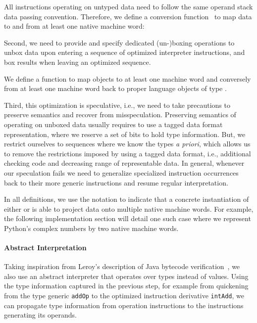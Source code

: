 \documentclass[preprint,10pt]{popl14conf}
\begin{document}
\begin{defn}
  All instructions operating on untyped data need to follow the same operand stack data passing
  convention.
  Therefore, we define a conversion function~ to map data to and from at least one
  native machine word:
  
\end{defn}

Second, we need to provide and specify dedicated (un-)boxing operations to unbox data upon entering a
sequence of optimized interpreter instructions, and box results when leaving an optimized sequence.
\begin{defn}
  We define a function  to map objects to at least one machine word and conversely
  from at least one machine word back to proper language objects of type .
  
\end{defn}
Third, this optimization is speculative, i.e., we need to take precautions to preserve semantics
and recover from misspeculation.
Preserving semantics of operating on unboxed data usually requires to use a tagged data format
representation, where we reserve a set of bits to hold type information.
But, we restrict ourselves to sequences where we know the types \emph{a priori}, which allows us to
remove the restrictions imposed by using a tagged data format, i.e., additional checking code and
decreasing range of representable data.
In general, whenever our speculation fails we need to generalize specialized instruction
occurrences back to their more generic instructions and resume regular interpretation.



In all definitions, we use the  notation to indicate that a concrete instantiation of either
 or  is able to project data onto multiple native machine words.
For example, the following implementation section will detail one such case where we represent
Python's complex numbers by two native machine words.

\paragraph{Abstract Interpretation}

Taking inspiration from Leroy's description of Java bytecode verification~\cite{leroy+03}, we also
use an abstract interpreter that operates over types instead of values.
Using the type information captured in the previous step, for example from quickening from the type
generic \texttt{addOp} to the optimized instruction derivative \texttt{intAdd}, we can propagate
type information from operation instructions to the instructions generating its operands.
\end{document}

